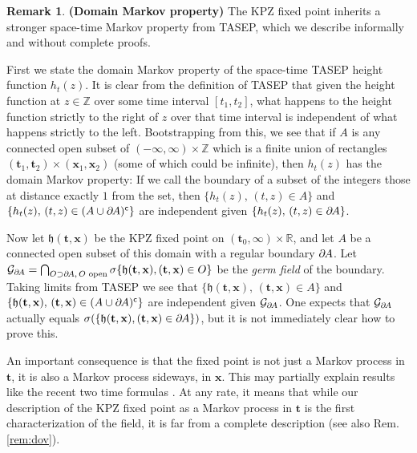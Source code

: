 \documentclass[letterpaper,reqno,11pt,oneside,final]{amsart}
\theoremstyle{definition}
\newtheorem{rem}[thm]{Remark}
\newcommand{\fh}{\mathfrak{h}}
\newcommand{\rr}{\mathbb{R}}
\newcommand{\zz}{\mathbb{Z}}
\newcommand{\tsm}{\hspace{-0.1em}}
\newcommand{\uptext}[1]{\text{\upshape{#1}}}
\newcommand{\ft}{\mathbf{t}}
\newcommand{\fx}{\mathbf{x}}
\numberwithin{equation}{section}
\begin{document}
\begin{rem}{\bf (Domain Markov property)} 
\enspace The KPZ fixed point inherits a stronger space-time Markov property from TASEP, which we describe
informally and without complete proofs.

\noindent First we state the domain Markov property of the space-time TASEP height function
$h_t(z)$.  It is clear from the definition of TASEP that given the height function at $z\in 
\zz$ over some time interval $[t_1,t_2]$, what happens to the height function strictly to the right of $z$ over that time interval is independent of what happens strictly to the left.  
Bootstrapping from this, we see that if $A$ is any connected open subset of 
$ (-\infty,\infty)\times \zz $ which is a finite  union of rectangles $(\ft_1,\ft_2)\times(\fx_1,\fx_2)$ (some of which could be infinite), then $h_t(z)$ has the domain Markov property: If we call the boundary of a subset of the integers those at distance exactly $1$ from the set, then  $\{h_t(z),\,(t,z)\in A\}$ and $\{h_t(z),\,(t,z)\in(A\cup \partial\tsm A)^\mathsf{c}\}$ are independent given $\{h_t(z),\,(t,z)\in\partial\tsm A\}$.

\noindent Now let $\fh(\ft,\fx)$ be the KPZ fixed point on $(\ft_0,\infty)\times \rr$, and let 
$A$ be a connected open subset of this domain with a regular boundary $\partial\tsm A$.  Let $\mathcal{G}_{\partial\tsm A}
= \bigcap_{O\supset \partial\tsm A,\, O\uptext{ open}} \sigma\{ \fh(\ft,\fx), (\ft,\fx)\in O\}$ be the \emph{germ field} of the boundary.  Taking limits from TASEP we see that  $\{\fh(\ft,\fx),\,(\ft,\fx)\in A\}$ and $\{\fh(\ft,\fx),\,(\ft,\fx)\in (A\cup \partial\tsm A)^\mathsf{c}\}$ are independent given $\mathcal{G}_{\partial\tsm A}$.  
 One expects that $\mathcal{G}_{\partial\tsm A}$  actually equals $\sigma(\{ \fh(\ft,\fx), (\ft,\fx)\in \partial\tsm A\})$, but it is not immediately clear how to prove this.

\noindent An important consequence is that the fixed point is not just a Markov process in $\ft$, it is also a Markov process sideways, in $\fx$.
This may partially explain results like the recent two time formulas \cite{johanssonTwoTimeBrownian,johanssonTwoTimeGeometric,baikLiu,johanssonRahman}.
At any rate, it means that while our description of the KPZ fixed point as a Markov process in $\ft$ is the first characterization of the field, it is far from a complete description (see also Rem. \ref{rem:dov}).
\end{rem}
\end{document}
